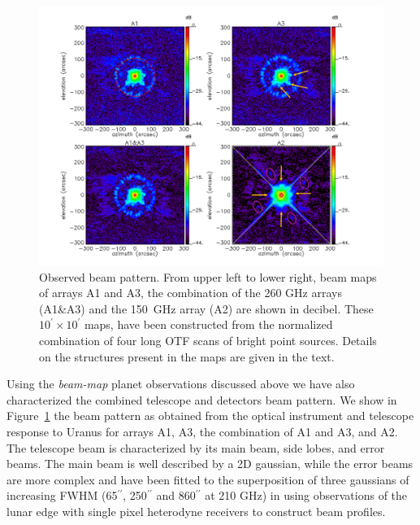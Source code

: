 \documentclass[]{aa} %
\begin{document}
\begin{figure}[h]
   \centering
    \includegraphics[width=0.9\linewidth]{Beams_features.pdf}
     
      \caption{Observed beam pattern. From upper left to lower right,
        beam maps of arrays A1 and A3, the
        combination of the 260 GHz arrays (A1\&A3) and the 150~GHz array
        (A2) are shown in decibel. These $10^{\prime} \times 10^{\prime}$ maps, have been constructed from
        the normalized combination of four long OTF scans of bright point
        sources. Details on the structures present in the maps are given in the text.}
         \label{fig:beampattern}
\end{figure}

Using the {\it beam-map} planet observations discussed above we have also characterized the combined telescope and detectors beam pattern. We show in Figure~\ref{fig:beampattern} the beam pattern as obtained from the optical instrument and telescope response to Uranus for arrays A1, A3, the combination of A1 and A3, and A2. The telescope beam is characterized by its main beam, side lobes, and error beams. The main beam is well described by a 2D gaussian, while the error beams are more complex and have been fitted to the superposition of three gaussians of increasing FWHM (65$^{\prime \prime}$, 250$^{\prime \prime}$ and 860$^{\prime \prime}$ at 210 GHz) in \cite{greve1998,kramer2013} using observations of the lunar edge with single pixel heterodyne receivers to construct beam profiles.
\end{document}
